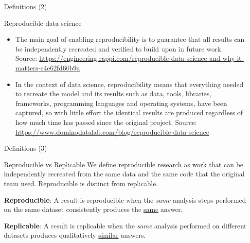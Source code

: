 \documentclass[10pt,aspectratio=169,notes]{beamer} %
\begin{document}
\begin{frame}[label=frame5]{Definitions (2)}
	\begin{alertblock}{Reproducible data science}
		\begin{itemize}
			\item The main goal of enabling reproducibility is to guarantee that all results can be independently recreated and verified to build upon in future work.\\
			Source: \url{https://engineering.rappi.com/reproducible-data-science-and-why-it-matters-e4e62fd60b9a}
			\item In the context of data science, reproducibility means that everything needed to recreate the model and its results such as data, tools, libraries, frameworks, programming languages and operating systems, have been captured, so with little effort the identical results are produced regardless of how much time has passed since the original project.
			Source: \url{https://www.dominodatalab.com/blog/reproducible-data-science}
		\end{itemize}	
	\end{alertblock}
\end{frame}
\begin{frame}[label=frame6]{Definitions (3)}
	\begin{alertblock}{Reproducible vs Replicable}
			We define reproducible research as work that can be independently recreated from the same data and the same code that the original team used. 
			Reproducible is distinct from replicable.
			\vspace{5mm}
			
			\textbf{Reproducible}: A result is reproducible when the \emph{same} analysis steps performed on the \alert{same dataset} consistently produces the \underline{same} answer.
			
			\textbf{Replicable}: A result is replicable when the \emph{same} analysis performed on \alert{different datasets} produces qualitatively \underline{similar} answers.
	\end{alertblock}
\end{frame}
\end{document}
